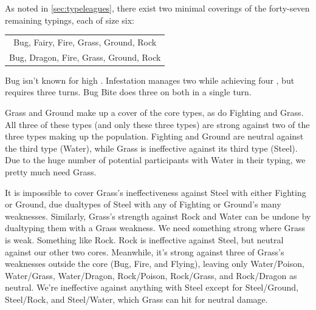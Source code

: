 As noted in \autoref{sec:typeleagues}, there exist two minimal coverings of the forty-seven
  remaining typings, each of size six:
\begin{center}
\begin{tabular}{c}
 Bug, Fairy, Fire, Grass, Ground, Rock\\
 Bug, Dragon, Fire, Grass, Ground, Rock\\
\end{tabular}
\end{center}
Bug isn't known for high \PPT{}\@. Infestation manages two while achieving four \EPT{},
 but requires three turns. Bug Bite does three on both in a single turn.

Grass and Ground make up a cover of the core types, as do Fighting and Grass.
All three of these types (and only these three types) are strong against two of the three
  types making up the population.
Fighting and Ground are neutral against the third type (Water), while Grass is ineffective
  against its third type (Steel).
Due to the huge number of potential participants with Water in their typing, we pretty
  much need Grass.

It is impossible to cover Grass's ineffectiveness against Steel with either Fighting or Ground,
  due dualtypes of Steel with any of Fighting or Ground's many weaknesses.
Similarly, Grass's strength against Rock and Water can be undone by dualtyping them with a Grass weakness.
We need something strong where Grass is weak.
Something like Rock.
Rock is ineffective against Steel, but neutral against our other two cores.
Meanwhile, it's strong against three of Grass's weaknesses outside the core (Bug, Fire, and Flying),
  leaving only Water/Poison, Water/Grass, Water/Dragon, Rock/Poison, Rock/Grass, and Rock/Dragon
  as neutral.
We're ineffective against anything with Steel except for Steel/Ground, Steel/Rock, and Steel/Water, which
  Grass can hit for neutral damage.

